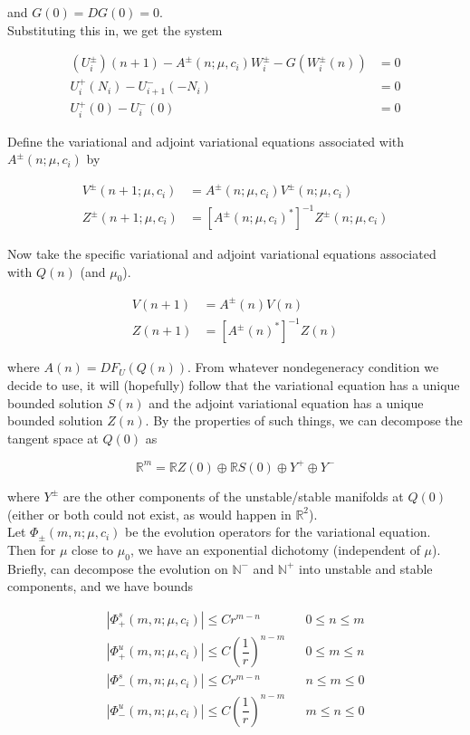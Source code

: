 \documentclass[12pt]{article}
\def\R{{\mathbb R}}
\def\N{{\mathbb N}}
\begin{document}
and $G(0) = DG(0) = 0$.\\

Substituting this in, we get the system

\begin{align}
(U_i^\pm)(n+1) - A^\pm(n; \mu, c_i) W_i^\pm - G(W_i^\pm(n)) &= 0 \\
U_i^+(N_i) - U_{i+1}^-(-N_i) &= 0 \\
U_i^+(0) - U_i^-(0) &= 0
\end{align}

Define the variational and adjoint variational equations associated with $A^\pm(n; \mu, c_i)$ by

\begin{align}
V^\pm(n+1; \mu, c_i) &= A^\pm(n; \mu, c_i) V^\pm(n; \mu, c_i) \label{vareq} \\
Z^\pm(n+1; \mu, c_i) &= [A^\pm(n; \mu, c_i)^*]^{-1} Z^\pm(n; \mu, c_i) \label{adjvareq}
\end{align}

Now take the specific variational and adjoint variational equations associated with $Q(n)$ (and $\mu_0$).

\begin{align}
V(n+1) &= A^\pm(n) V(n) \label{vareqQ} \\
Z(n+1) &= [A^\pm(n)^*]^{-1} Z(n) \label{adjvareqQ}
\end{align}

where $A(n) = DF_{U}(Q(n))$. From whatever nondegeneracy condition we decide to use, it will (hopefully) follow that the variational equation has a unique bounded solution $S(n)$ and the adjoint variational equation has a unique bounded solution $Z(n)$. By the properties of such things, we can decompose the tangent space at $Q(0)$ as

\[
\R^m = \R Z(0) \oplus \R S(0) \oplus Y^+ \oplus Y^-
\]

where $Y^\pm$ are the other components of the unstable/stable manifolds at $Q(0)$ (either or both could not exist, as would happen in $\R^2$).\\

Let $\Phi_\pm(m, n; \mu, c_i)$ be the evolution operators for the variational equation. Then for $\mu$ close to $\mu_0$, we have an exponential dichotomy (independent of $\mu$). Briefly, can decompose the evolution on $\N^-$ and $\N^+$ into unstable and stable components, and we have bounds

\begin{align*}
|\Phi_+^s(m, n; \mu, c_i)| \leq C r^{m - n} && 0 \leq n \leq m \\
|\Phi_+^u(m, n; \mu, c_i)| \leq C \left( \dfrac{1}{r} \right)^{n-m} && 0 \leq m \leq n \\
|\Phi_-^s(m, n; \mu, c_i)| \leq C r^{m - n} && n \leq m \leq 0 \\
|\Phi_-^u(m, n; \mu, c_i)| \leq C \left( \dfrac{1}{r} \right)^{n-m} && m \leq n \leq 0\\
\end{align*}
\end{document}
